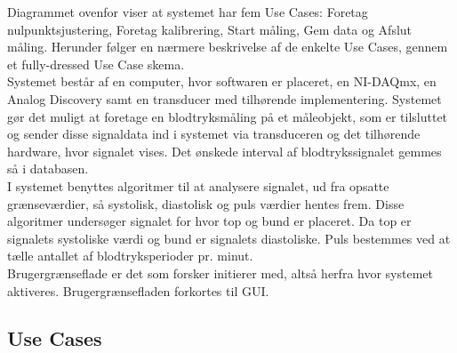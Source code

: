 Diagrammet ovenfor viser at systemet har fem Use Cases: Foretag nulpunktsjustering, Foretag kalibrering, Start måling, Gem data og Afslut måling. Herunder følger en nærmere beskrivelse af de enkelte Use Cases, gennem et fully-dressed Use Case skema. \\
Systemet består af en computer, hvor softwaren er placeret, en NI-DAQmx, en Analog Discovery samt en transducer med tilhørende implementering. Systemet gør det muligt at foretage en blodtryksmåling på et måleobjekt, som er tilsluttet og sender disse signaldata ind i systemet via transduceren og det tilhørende hardware, hvor signalet vises. Det ønskede interval af blodtrykssignalet gemmes så i databasen. \\
I systemet benyttes algoritmer til at analysere signalet, ud fra opsatte grænseværdier, så systolisk, diastolisk og puls værdier hentes frem. Disse algoritmer undersøger signalet for hvor top og bund er placeret. Da top er signalets systoliske værdi og bund er signalets diastoliske. Puls bestemmes ved at tælle antallet af blodtryksperioder pr. minut. \\    
Brugergrænseflade er det som forsker initierer med, altså herfra hvor systemet aktiveres. Brugergrænsefladen forkortes til GUI. 

\subsection{Use Cases}

